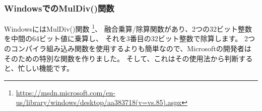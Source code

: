 \subsubsection{WindowsでのMulDiv()関数}

WindowsにはMulDiv()関数
\footnote{\url{https://msdn.microsoft.com/en-us/library/windows/desktop/aa383718(v=vs.85).aspx}}、
融合乗算/除算関数があり、2つの32ビット整数を中間の64ビット値に乗算し、
それを3番目の32ビット整数で除算します。 
2つのコンパイラ組み込み関数を使用するよりも簡単なので、Microsoftの開発者はそのための特別な関数を作りました。 
そして、これはその使用法から判断すると、忙しい機能です。
